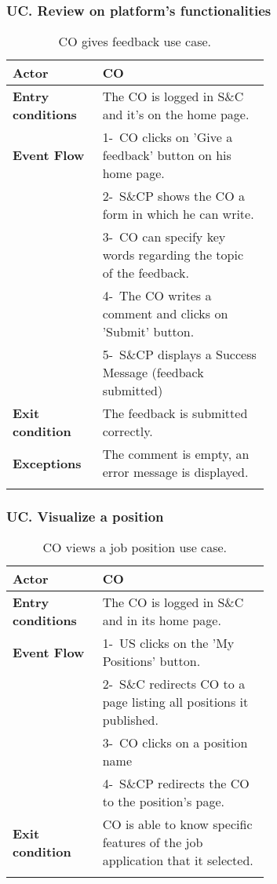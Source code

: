 \subsubsection*{UC\cuc . Review on platform's functionalities}
\begin{center}
    \begin{longtable}{|l|p{0.65\linewidth}|}
        \hline
        \textbf{Actor}            & CO \\
        \hline
        \textbf{Entry conditions} & The CO is logged in S\&C and it's on the home page. \\
        \hline
        \textbf{Event Flow}       & 1-\ CO clicks on 'Give a feedback' button on his home page.  \\
        & 2-\ S\&CP shows the CO a form in which he can write.\\
        & 3-\ CO can specify key words regarding the topic of the feedback.\\
        & 4-\ The CO writes a comment and clicks on 'Submit' button.\\
        & 5-\ S\&CP displays a Success Message (feedback submitted)\\
        \hline
        \textbf{Exit condition}   &  The feedback is submitted correctly. \\
        \hline
        \textbf{Exceptions}       & The comment is empty, an error message is displayed. \\
        \hline
        \caption{CO gives feedback use case.}
        \label{tab: cp_use_case}
    \end{longtable}
\end{center}


\subsubsection*{UC\cuc . Visualize a position}
\begin{center}
    \begin{longtable}{|l|p{0.65\linewidth}|}
        \hline
        \textbf{Actor}            & CO \\
        \hline
        \hline
        \textbf{Entry conditions} & The CO is logged in S\&C and in its home page. \\
        \hline
        \textbf{Event Flow}       & 1-\ US clicks on the 'My Positions' button.  \\
        & 2-\ S\&C redirects CO to a page listing all positions it published.\\
        & 3-\ CO clicks on a position name \\
        & 4-\ S\&CP redirects the CO to the position's page.\\
        \hline
        \textbf{Exit condition}   & CO is able to know specific features of the job application that it selected. \\
        \hline
        \hline
        \caption{CO views a job position use case.}
        \label{tab: cp_use_case}
    \end{longtable}
\end{center}

